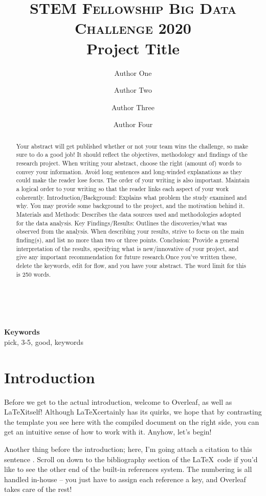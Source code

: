 \documentclass[10pt,twocolumn,letterpaper]{article}
\title{
		\usefont{OT1}{bch}{b}{n}
		\normalfont \normalsize \textsc{STEM Fellowship Big Data Challenge 2020} \\ [10pt]
		\huge Project Title \\
}
\author[1]{Author One}
\author[1]{Author Two}
\author[1]{Author Three}
\author[2]{Author Four}
\affil[1]{High School 1}
\affil[2]{High School 2}
\begin{document}
\maketitle

\begin{abstract}
Your abstract will get published whether or not your team wins the challenge, so make sure to do a good job! It should reflect the objectives, methodology and findings of the research project. When writing your abstract, choose the right (amount of) words to convey your information. Avoid long sentences and long-winded explanations as they could make the reader lose focus. The order of your writing is also important. Maintain a logical order to your writing so that the reader links each aspect of your work coherently. Introduction/Background: Explains what problem the study examined and why. You may provide some background to the project, and the motivation behind it. Materials and Methods: Describes the data sources used and methodologies adopted for the data analysis. Key Findings/Results: Outlines the discoveries/what was observed from the analysis. When describing your results, strive to focus on the main finding(s), and list no more than two or three points. Conclusion: Provide a general interpretation of the results, specifying what is new/innovative of your project, and give any important recommendation for future research.Once you've written these, delete the keywords, edit for flow, and you have your abstract. The word limit for this is 250 words.
\end{abstract} \\ 
\\ 
{\textbf{Keywords} \\
pick, 3-5, good, keywords}

\section{Introduction}
Before we get to the actual introduction, welcome to Overleaf, as well as \LaTeX itself! Although \LaTeX certainly has its quirks, we hope that by contrasting the template you see here with the compiled document on the right side, you can get an intuitive sense of how to work with it. Anyhow, let's begin!

Another thing before the introduction; here, I'm going attach a citation to this sentence \cite{ReferenceName}. Scroll on down to the bibliography section of the \LaTeX\ code if you'd like to see the other end of the built-in references system. The numbering is all handled in-house -- you just have to assign each reference a key, and Overleaf takes care of the rest!
\end{document}

